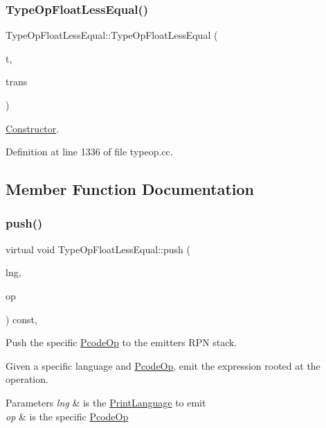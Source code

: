 \subsubsection{\texorpdfstring{TypeOpFloatLessEqual()}{TypeOpFloatLessEqual()}}
{\footnotesize\ttfamily Type\+Op\+Float\+Less\+Equal\+::\+Type\+Op\+Float\+Less\+Equal (\begin{DoxyParamCaption}\item[{\mbox{\hyperlink{class_type_factory}{Type\+Factory}} $\ast$}]{t,  }\item[{const \mbox{\hyperlink{class_translate}{Translate}} $\ast$}]{trans }\end{DoxyParamCaption})}



\mbox{\hyperlink{class_constructor}{Constructor}}. 



Definition at line 1336 of file typeop.\+cc.



\subsection{Member Function Documentation}
\mbox{\label{class_type_op_float_less_equal_a9af8f29788c448390fb9ee38a3060562}} 
\subsubsection{\texorpdfstring{push()}{push()}}
{\footnotesize\ttfamily virtual void Type\+Op\+Float\+Less\+Equal\+::push (\begin{DoxyParamCaption}\item[{\mbox{\hyperlink{class_print_language}{Print\+Language}} $\ast$}]{lng,  }\item[{const \mbox{\hyperlink{class_pcode_op}{Pcode\+Op}} $\ast$}]{op }\end{DoxyParamCaption}) const\hspace{0.3cm}{\ttfamily [inline]}, {\ttfamily [virtual]}}



Push the specific \mbox{\hyperlink{class_pcode_op}{Pcode\+Op}} to the emitter\textquotesingle{}s R\+PN stack. 

Given a specific language and \mbox{\hyperlink{class_pcode_op}{Pcode\+Op}}, emit the expression rooted at the operation. 
\begin{DoxyParams}{Parameters}
{\em lng} & is the \mbox{\hyperlink{class_print_language}{Print\+Language}} to emit \\
\hline
{\em op} & is the specific \mbox{\hyperlink{class_pcode_op}{Pcode\+Op}} \\
\hline
\end{DoxyParams}


